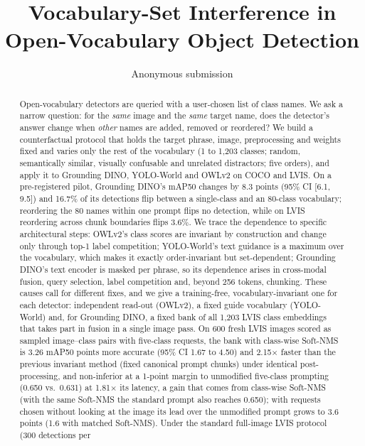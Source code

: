 \documentclass[10pt,twocolumn,letterpaper]{article}
\title{Vocabulary-Set Interference in Open-Vocabulary Object Detection}
\author{Anonymous submission}
\begin{document}
\maketitle

\begin{abstract}
Open-vocabulary detectors are queried with a user-chosen list of class names. We ask a narrow question: for the
\emph{same} image and the \emph{same} target name, does the detector's answer change when \emph{other} names are added,
removed or reordered? We build a counterfactual protocol that holds the target phrase, image, preprocessing and
weights fixed and varies only the rest of the vocabulary (1 to 1{,}203 classes; random, semantically similar, visually
confusable and unrelated distractors; five orders), and apply it to Grounding DINO, YOLO-World and OWLv2 on COCO and
LVIS. On a pre-registered pilot, Grounding DINO's mAP50 changes by 8.3 points (95\% CI [6.1, 9.5]) and 16.7\% of its
detections flip between a single-class and an 80-class vocabulary; reordering the 80 names within one prompt flips
no detection, while on LVIS reordering across chunk boundaries flips 3.6\%. We trace the dependence to specific architectural steps: OWLv2's class
scores are invariant by construction and change only through top-1 label competition; YOLO-World's text guidance is a
maximum over the vocabulary, which makes it exactly order-invariant but set-dependent; Grounding DINO's text encoder is
masked per phrase, so its dependence arises in cross-modal fusion, query selection, label competition and, beyond 256
tokens, chunking. These causes call for different fixes, and we give a training-free, vocabulary-invariant one for
each detector: independent read-out (OWLv2), a fixed guide vocabulary (YOLO-World) and, for Grounding DINO, a fixed bank
of all 1{,}203 LVIS class embeddings that takes part in fusion in a single image pass. On 600 fresh LVIS images scored as sampled
image--class pairs with five-class requests, the bank with class-wise Soft-NMS is 3.26 mAP50 points more accurate (95\% CI 1.67 to 4.50) and 2.15$\times$ faster than the
previous invariant method (fixed canonical prompt chunks) under identical post-processing, and non-inferior at a 1-point
margin to unmodified five-class prompting (0.650 vs.\ 0.631) at 1.81$\times$ its latency, a gain that comes from class-wise Soft-NMS~\cite{softnms} (with the same Soft-NMS the standard prompt also reaches 0.650); with requests chosen without
looking at the image its lead over the unmodified prompt grows to 3.6 points (1.6 with matched Soft-NMS). Under the standard full-image LVIS protocol (300 detections per

\end{abstract}
\end{document}
